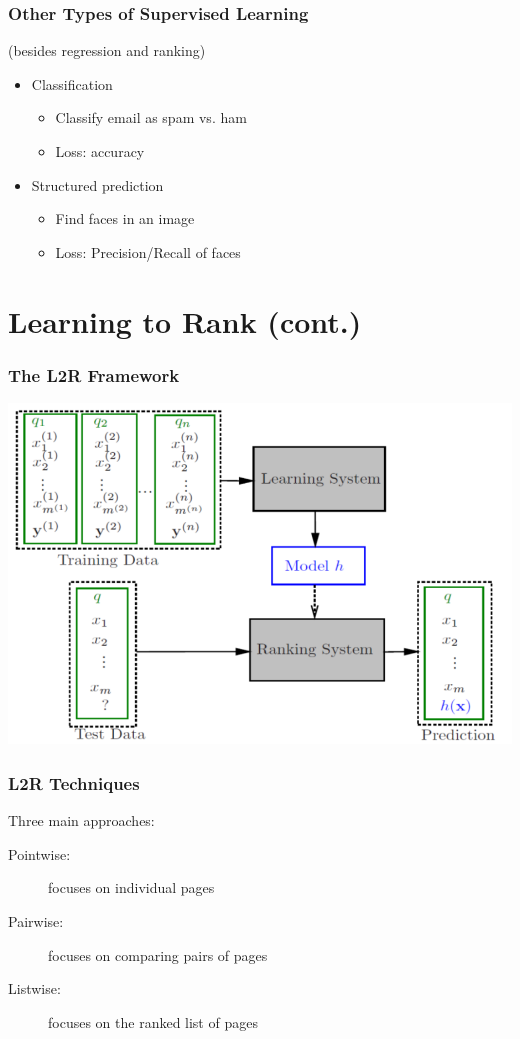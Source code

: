 \documentclass{beamer}
\begin{document}
\begin{frame}
    \frametitle{Other Types of Supervised Learning}
    (besides regression and ranking)
    \begin{itemize}
    \item Classification
        \begin{itemize}
        \item Classify email as spam vs. ham 
        \item Loss: accuracy 
        \end{itemize}
    \item Structured prediction 
        \begin{itemize}
        \item Find faces in an image 
        \item Loss: Precision/Recall of faces 
        \end{itemize}
    \end{itemize}
\end{frame}


\section{Learning to Rank (cont.)}

\begin{frame}
    \frametitle{The L2R Framework}
    \centering
    \includegraphics[width=\linewidth]{l2r_framework}
\end{frame}

\begin{frame}
    \frametitle{L2R Techniques}
    Three main approaches:
    \begin{description}
    \item[Pointwise:] focuses on individual pages
    \item[Pairwise:] focuses on comparing pairs of pages
    \item[Listwise:] focuses on the ranked list of pages
    \end{description}
\end{frame}
\end{document}
